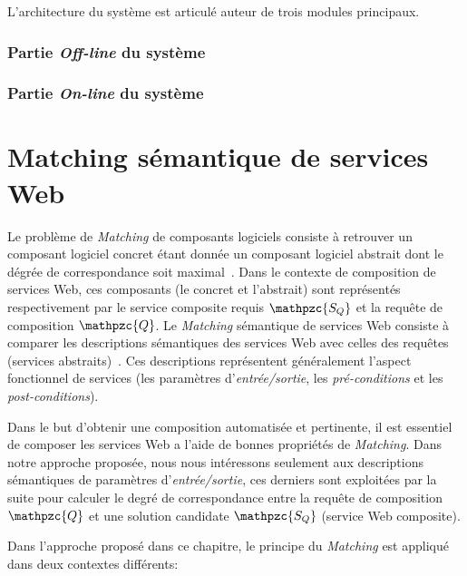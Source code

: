 L'architecture du système est articulé auteur de trois modules
principaux.
\subsubsection{Partie \emph{Off-line} du système}
\label{sec:presentation-architecture-online}

\subsubsection{Partie \emph{On-line} du système}
\label{sec:presentation-architecture-online}

\newpage
\section{Matching sémantique de services Web}
\label{sec:ch3/matching}

Le problème de \emph{Matching} de composants logiciels consiste à
retrouver un composant logiciel concret étant donnée un composant
logiciel abstrait dont le dégrée de correspondance soit
maximal~\cite{lecue2008composition}. Dans le contexte de composition
de services Web, ces composants (le concret et l'abstrait) sont
représentés respectivement par le service composite requis {\large
  $\mathpzc{S_Q}$} et la requête de composition {\large
  $\mathpzc{Q}$}. Le \emph{Matching} sémantique de services Web
consiste à comparer les descriptions sémantiques des services Web avec
celles des requêtes (services
abstraits)~\cite{paolucci2002semantic}. Ces descriptions représentent
généralement l'aspect fonctionnel de services (les paramètres
d'\emph{entrée/sortie}, les \emph{pré-conditions} et les
\emph{post-conditions}).\medskip

Dans le but d'obtenir une composition automatisée et pertinente, il
est essentiel de composer les services Web a l'aide de bonnes
propriétés de \emph{Matching}. Dans notre approche proposée, nous nous
intéressons seulement aux descriptions sémantiques de paramètres
d'\emph{entrée/sortie}, ces derniers sont exploitées par la suite pour
calculer le degré de correspondance entre la requête de composition
{\large $\mathpzc{Q}$} et une solution candidate {\large
  $\mathpzc{S_Q}$} (service Web composite).\medskip

Dans l'approche proposé dans ce chapitre, le principe du
\emph{Matching} est appliqué dans deux contextes différents:\medskip

